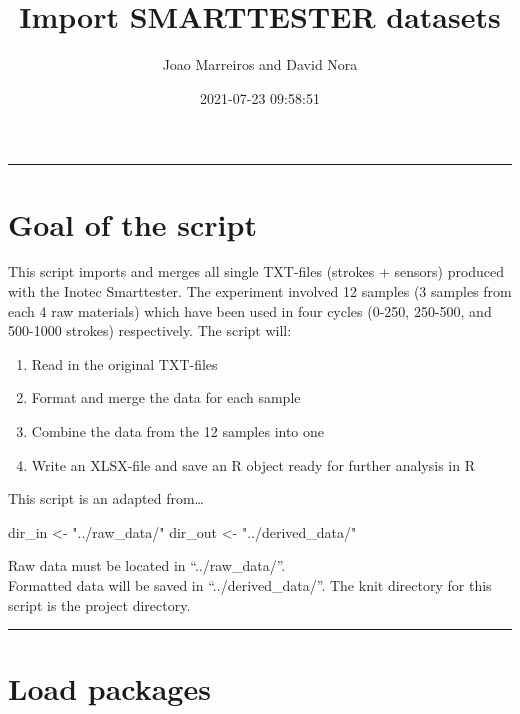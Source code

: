 \documentclass[
]{article}
\title{Import SMARTTESTER datasets}
\author{Joao Marreiros and David Nora}
\date{2021-07-23 09:58:51}
\newenvironment{Shaded}{\begin{snugshade}}{\end{snugshade}}
\newcommand{\NormalTok}[1]{#1}
\newcommand{\OtherTok}[1]{\textcolor[rgb]{0.56,0.35,0.01}{#1}}
\newcommand{\StringTok}[1]{\textcolor[rgb]{0.31,0.60,0.02}{#1}}
\providecommand{\tightlist}{%
  \setlength{\itemsep}{0pt}\setlength{\parskip}{0pt}}
\begin{document}
\maketitle

\begin{center}\rule{0.5\linewidth}{0.5pt}\end{center}

\hypertarget{goal-of-the-script}{%
\section{Goal of the script}\label{goal-of-the-script}}

This script imports and merges all single TXT-files (strokes + sensors)
produced with the Inotec Smarttester. The experiment involved 12 samples
(3 samples from each 4 raw materials) which have been used in four
cycles (0-250, 250-500, and 500-1000 strokes) respectively. The script
will:

\begin{enumerate}
\def\labelenumi{\arabic{enumi}.}
\tightlist
\item
  Read in the original TXT-files\\
\item
  Format and merge the data for each sample
\item
  Combine the data from the 12 samples into one
\item
  Write an XLSX-file and save an R object ready for further analysis in
  R
\end{enumerate}

This script is an adapted from\ldots{}

\begin{Shaded}
\begin{Highlighting}[]
\NormalTok{dir\_in }\OtherTok{\textless{}{-}} \StringTok{"../raw\_data/"}
\NormalTok{dir\_out }\OtherTok{\textless{}{-}} \StringTok{"../derived\_data/"}
\end{Highlighting}
\end{Shaded}

Raw data must be located in ``../raw\_data/''.\\
Formatted data will be saved in ``../derived\_data/''. The knit
directory for this script is the project directory.

\begin{center}\rule{0.5\linewidth}{0.5pt}\end{center}

\hypertarget{load-packages}{%
\section{Load packages}\label{load-packages}}
\end{document}

